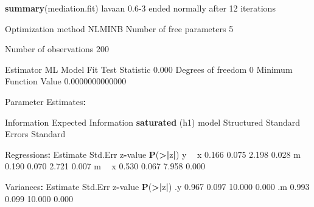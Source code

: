 \documentclass[]{article}
\newenvironment{Shaded}{\begin{snugshade}}{\end{snugshade}}
\newcommand{\DecValTok}[1]{\textcolor[rgb]{0.00,0.00,0.81}{#1}}
\newcommand{\ErrorTok}[1]{\textcolor[rgb]{0.64,0.00,0.00}{\textbf{#1}}}
\newcommand{\FloatTok}[1]{\textcolor[rgb]{0.00,0.00,0.81}{#1}}
\newcommand{\KeywordTok}[1]{\textcolor[rgb]{0.13,0.29,0.53}{\textbf{#1}}}
\newcommand{\NormalTok}[1]{#1}
\newcommand{\OperatorTok}[1]{\textcolor[rgb]{0.81,0.36,0.00}{\textbf{#1}}}
\newcommand{\StringTok}[1]{\textcolor[rgb]{0.31,0.60,0.02}{#1}}
\begin{document}
\begin{Shaded}
\begin{Highlighting}[]
\KeywordTok{summary}\NormalTok{(mediation.fit)}
\NormalTok{lavaan }\FloatTok{0.6}\DecValTok{-3}\NormalTok{ ended normally after }\DecValTok{12}\NormalTok{ iterations}

\NormalTok{  Optimization method                           NLMINB}
\NormalTok{  Number of free parameters                          }\DecValTok{5}

\NormalTok{  Number of observations                           }\DecValTok{200}

\NormalTok{  Estimator                                         ML}
\NormalTok{  Model Fit Test Statistic                       }\FloatTok{0.000}
\NormalTok{  Degrees of freedom                                 }\DecValTok{0}
\NormalTok{  Minimum Function Value               }\FloatTok{0.0000000000000}

\NormalTok{Parameter Estimates}\OperatorTok{:}

\StringTok{  }\NormalTok{Information                                 Expected}
\NormalTok{  Information }\KeywordTok{saturated}\NormalTok{ (h1) model          Structured}
\NormalTok{  Standard Errors                             Standard}

\NormalTok{Regressions}\OperatorTok{:}
\StringTok{                   }\NormalTok{Estimate  Std.Err  z}\OperatorTok{-}\NormalTok{value  }\KeywordTok{P}\NormalTok{(}\OperatorTok{>}\ErrorTok{|}\NormalTok{z}\OperatorTok{|}\NormalTok{)}
\NormalTok{  y }\OperatorTok{~}\StringTok{                                                 }
\StringTok{    }\NormalTok{x                 }\FloatTok{0.166}    \FloatTok{0.075}    \FloatTok{2.198}    \FloatTok{0.028}
\NormalTok{    m                 }\FloatTok{0.190}    \FloatTok{0.070}    \FloatTok{2.721}    \FloatTok{0.007}
\NormalTok{  m }\OperatorTok{~}\StringTok{                                                 }
\StringTok{    }\NormalTok{x                 }\FloatTok{0.530}    \FloatTok{0.067}    \FloatTok{7.958}    \FloatTok{0.000}

\NormalTok{Variances}\OperatorTok{:}
\StringTok{                   }\NormalTok{Estimate  Std.Err  z}\OperatorTok{-}\NormalTok{value  }\KeywordTok{P}\NormalTok{(}\OperatorTok{>}\ErrorTok{|}\NormalTok{z}\OperatorTok{|}\NormalTok{)}
\NormalTok{   .y                 }\FloatTok{0.967}    \FloatTok{0.097}   \FloatTok{10.000}    \FloatTok{0.000}
\NormalTok{   .m                 }\FloatTok{0.993}    \FloatTok{0.099}   \FloatTok{10.000}    \FloatTok{0.000}
\end{Highlighting}
\end{Shaded}
\end{document}
